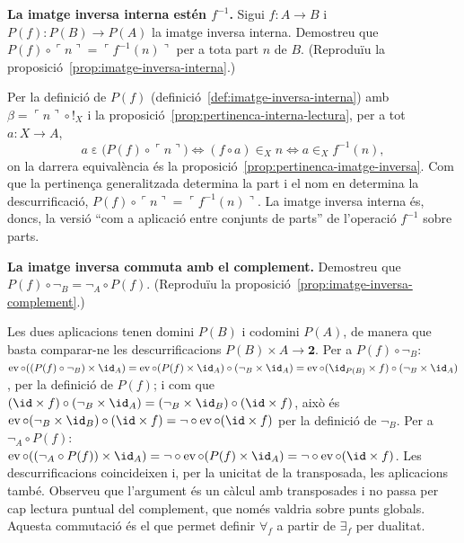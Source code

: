 \begin{exercici}
\textbf{La imatge inversa interna estén \(f^{-1}\).} Sigui \(f\colon A\to B\) i \(P(f)\colon P(B)\to P(A)\) la imatge inversa interna. Demostreu que \(P(f)\circ\ulcorner n\urcorner=\ulcorner f^{-1}(n)\urcorner\) per a tota part \(n\) de \(B\). (Reproduïu la proposició~\ref{prop:imatge-inversa-interna}.)
\end{exercici}
\begin{solucio}
Per la definició de \(P(f)\) (definició~\ref{def:imatge-inversa-interna}) amb \(\beta=\ulcorner n\urcorner\circ{!}_X\) i la proposició~\ref{prop:pertinenca-interna-lectura}, per a tot \(a\colon X\to A\),
\[
a\mathrel{\varepsilon}\bigl(P(f)\circ\ulcorner n\urcorner\bigr)\iff(f\circ a)\in_X n\iff a\in_X f^{-1}(n),
\]
on la darrera equivalència és la proposició~\ref{prop:pertinenca-imatge-inversa}. Com que la pertinença generalitzada determina la part i el nom en determina la descurrificació, \(P(f)\circ\ulcorner n\urcorner=\ulcorner f^{-1}(n)\urcorner\). La imatge inversa interna és, doncs, la versió \enquote{com a aplicació entre conjunts de parts} de l'operació \(f^{-1}\) sobre parts.
\end{solucio}

\begin{exercici}
\textbf{La imatge inversa commuta amb el complement.} Demostreu que \(P(f)\circ\neg_B=\neg_A\circ P(f)\). (Reproduïu la proposició~\ref{prop:imatge-inversa-complement}.)
\end{exercici}
\begin{solucio}
Les dues aplicacions tenen domini \(P(B)\) i codomini \(P(A)\), de manera que basta comparar-ne les descurrificacions \(P(B)\times A\to\mathbf2\). Per a \(P(f)\circ\neg_B\): \(\operatorname{ev}\circ((P(f)\circ\neg_B)\times\id_A)=\operatorname{ev}\circ(P(f)\times\id_A)\circ(\neg_B\times\id_A)=\operatorname{ev}\circ(\id_{P(B)}\times f)\circ(\neg_B\times\id_A)\), per la definició de \(P(f)\); i com que \((\id\times f)\circ(\neg_B\times\id_A)=(\neg_B\times\id_B)\circ(\id\times f)\), això és \(\operatorname{ev}\circ(\neg_B\times\id_B)\circ(\id\times f)=\neg\circ\operatorname{ev}\circ(\id\times f)\) per la definició de \(\neg_B\). Per a \(\neg_A\circ P(f)\): \(\operatorname{ev}\circ((\neg_A\circ P(f))\times\id_A)=\neg\circ\operatorname{ev}\circ(P(f)\times\id_A)=\neg\circ\operatorname{ev}\circ(\id\times f)\). Les descurrificacions coincideixen i, per la unicitat de la transposada, les aplicacions també. Observeu que l'argument és un càlcul amb transposades i no passa per cap lectura puntual del complement, que només valdria sobre punts globals. Aquesta commutació és el que permet definir \(\forall_f\) a partir de \(\exists_f\) per dualitat.
\end{solucio}

